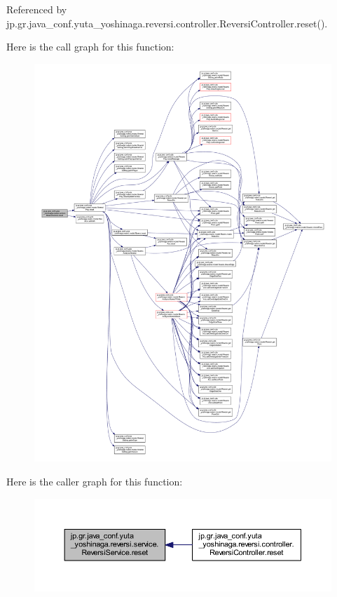 Referenced by jp.\+gr.\+java\+\_\+conf.\+yuta\+\_\+yoshinaga.\+reversi.\+controller.\+Reversi\+Controller.\+reset().

Here is the call graph for this function\+:
\nopagebreak
\begin{figure}[H]
\begin{center}
\leavevmode
\includegraphics[width=350pt]{classjp_1_1gr_1_1java__conf_1_1yuta__yoshinaga_1_1reversi_1_1service_1_1_reversi_service_ab2c1202edeb6a169bac4c65accc31165_cgraph}
\end{center}
\end{figure}
Here is the caller graph for this function\+:
\nopagebreak
\begin{figure}[H]
\begin{center}
\leavevmode
\includegraphics[width=350pt]{classjp_1_1gr_1_1java__conf_1_1yuta__yoshinaga_1_1reversi_1_1service_1_1_reversi_service_ab2c1202edeb6a169bac4c65accc31165_icgraph}
\end{center}
\end{figure}
